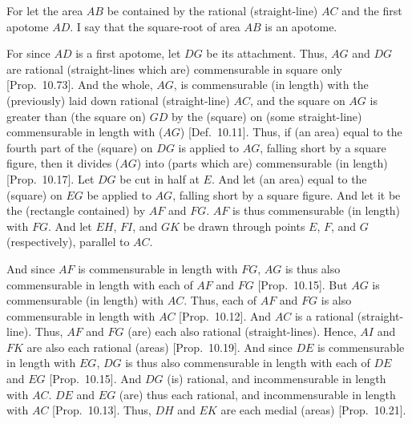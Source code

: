 \begin{Parallel}{}{}
{For let the area $AB$ be contained by the rational (straight-line) $AC$ and the first apotome $AD$. I say that the square-root of area $AB$ is an apotome.

For since $AD$ is a first apotome, let $DG$ be its attachment. Thus,
$AG$ and $DG$ are rational (straight-lines which are) commensurable in
square only [Prop.~10.73]. And the whole, $AG$,
is commensurable (in length) with the (previously) laid down rational (straight-line)
$AC$, and the square on $AG$ is greater than (the square on) $GD$
by the (square) on  (some straight-line) commensurable in length with ($AG$) [Def.~10.11]. Thus, if (an area) equal to the
fourth part of the (square) on $DG$ is applied to $AG$, falling short
by a square figure, then it divides ($AG$) into (parts which are) commensurable
(in length) [Prop.~10.17]. Let $DG$
be cut in half at $E$. And let (an area) equal to the (square) on
$EG$ be applied to $AG$, falling short by a square figure. And let
it be the (rectangle contained) by $AF$ and $FG$. $AF$ is
 thus commensurable (in length) with $FG$. And let $EH$, $FI$, and $GK$
be drawn through points $E$, $F$, and $G$ (respectively),
parallel to $AC$.

\epsfysize=1.3in
\centerline{}

And since $AF$ is commensurable in length with $FG$, $AG$ is thus also
commensurable in length with each of $AF$ and $FG$ [Prop.~10.15]. But $AG$ is commensurable (in length)
with $AC$. Thus, each of $AF$ and $FG$ is also commensurable in length with $AC$ 
[Prop.~10.12]. 
And $AC$ is a rational (straight-line). Thus,  $AF$ and $FG$ (are) each
also rational (straight-lines). Hence, $AI$ and
$FK$ are also each rational (areas) [Prop.~10.19]. And since $DE$ is commensurable
in length with $EG$, $DG$ is thus also commensurable
in length with each of $DE$ and $EG$ [Prop.~10.15]. And $DG$ (is) rational, and
incommensurable in length with $AC$. $DE$ and $EG$ (are) thus each
rational, and incommensurable in length with $AC$ [Prop.~10.13]. Thus, $DH$ and $EK$ are
each medial (areas) [Prop.~10.21].

}
\end{Parallel}
